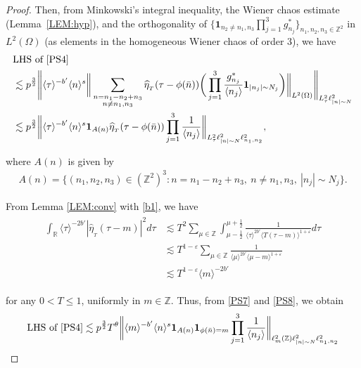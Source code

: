 \documentclass[%
11pt,  reqno]{amsart}
\newcommand{\1}{\hspace{0.2mm}\text{I}\hspace{0.2mm}}
\newcommand{\noi}{\noindent}
\newcommand{\Z}{\mathbb{Z}}
\newcommand{\R}{\mathbb{R}}
\newcommand{\eps}{\varepsilon}
\newcommand{\ft}{\widehat}
\newcommand{\ta}{\theta}
\renewcommand{\l}{\ell}
\renewcommand{\O}{\Omega}
\newcommand{\les}{\lesssim}
\newcommand{\jb}[1]
{\langle #1 \rangle}
\newcommand{\ind}{\mathbf 1}
\numberwithin{equation}{section}
\numberwithin{theorem}{section}
\begin{document}
\begin{proof}
\noi
Then,  from 
Minkowski's integral inequality, the Wiener chaos estimate (Lemma~\ref{LEM:hyp}), 
and
the orthogonality of 
$\big\{\ind_{n_2\ne n_1, n_3} \prod_{j=1}^3 g_{n_j}^*\big\}_{n_1, n_2, n_3\in \Z^2}$
in $L^2(\O)$
(as elements in the homogeneous Wiener chaos of order $3$), 
we have 
\begin{align}
\begin{split}
& \text{LHS of \eqref{PS4}}\\
& \les p^\frac 32 
\Bigg\|%
 \jb{\tau}^{-b'} \jb{n}^{s}  
 \bigg\|\sum_{\substack{n = n_1 - n_2 + n_3\\ n \neq n_1, n_3}} %
\ft \eta_{_T} (\tau - \phi (\bar n))
\bigg( \prod_{j=1}^3 \frac{g_{n_j}^*}{\jb{n_j}}\ind_{|n_j|\sim N_j}  \bigg)
\bigg\|_{L^2(\O)}
\Bigg\|_{L^2_\tau \l^2_{|n|\sim N}}
\\
& \les p^\frac 32 
\bigg\|
\jb{\tau }^{-b'} \jb{n}^{s}  
\ind_{A(n)} %
\ft \eta_{_T} (\tau - \phi (\bar n))
\prod_{j=1}^3 \frac{1}{\jb{n_j}}  
\bigg\|_{L^2_\tau  \l^2_{|n|\sim N} \l^2_{n_1, n_2}}, 
\end{split}
\label{PS7}
\end{align}

\noi
where $A(n)$ is given by 
\begin{align}
A(n) = \big\{(n_1, n_2, n_3) \in (\Z^2)^3:
n = n_1 - n_2 + n_3, \ 
n \ne n_1, n_3, \ |n_j|\sim N_j\big\}.
 \label{RT12a}
\end{align}

\noi
From 
Lemma \ref{LEM:conv} with \eqref{b1}, we have 
\begin{align}
\begin{split}
 \int_\R  \jb{\tau }^{-2b'}|\ft \eta_{_T} (\tau - m)|^2d\tau 
&  \les T^{2} 
\sum_{\mu \in \Z}
\int_{\mu - \frac 12}^{\mu+\frac 12} 
\frac{1}{\jb{\tau }^{2b'}\jb{T(\tau - m)}^{1+\eps}}d\tau \\
& \les T^{1-\eps} 
\sum_{\mu \in \Z}
\frac{1}{\jb{\mu }^{2b'}\jb{\mu - m}^{1+\eps}}\\
& \les T^{1-\eps} 
\jb{m}^{-2b'}
\end{split}
\label{PS8}
\end{align}

\noi
for any $0 < T \le 1$, uniformly in $m \in \Z$.
Thus, from \eqref{PS7} and \eqref{PS8}, we obtain
\begin{align}
 \text{LHS of \eqref{PS4}}
 \les p^\frac 32 T^\ta
\bigg\|
\jb{m}^{-b'} \jb{n}^{s}  
\ind_{A(n)} \ind_{\phi (\bar n) = m}
\prod_{j=1}^3 \frac{1}{\jb{n_j}}  
\bigg\|_{\l^2_m  (\Z) \l^2_{|n|\sim N} \l^2_{n_1, n_2}}
\label{PS9}
\end{align}


\end{proof}
\end{document}
